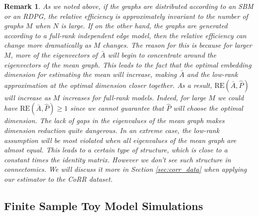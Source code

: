\documentclass[10pt,letterpaper]{article}
\newtheorem{remark}[fact]{Remark}
\renewcommand{\hat}{\widehat}
\begin{document}
\begin{remark}\label{remark:low_rank}
As we noted above, if the graphs are distributed according to an SBM or an RDPG, the relative efficiency is approximately invariant to the number of graphs $M$ when $N$ is large.
If on the other hand, the graphs are generated according to a full-rank independent edge model, then the relative efficiency can change more dramatically as $M$ changes. 
The reason for this is because for larger $M$, more of the eigenvectors of $\bar{A}$ will begin to concentrate around the eigenvectors of the mean graph.
This leads to the fact that the optimal embedding dimension for estimating the mean will increase, making $\bar{A}$ and the low-rank approximation at the optimal dimension closer together. 
As a result, $\mathrm{RE}(\bar{A},\hat{P})$ will increase as $M$ increases for full-rank models.
Indeed, for large $M$ we could have $\mathrm{RE}(\bar{A},\hat{P})\geq 1$ since we cannot guarantee that $\hat{P}$ will choose the optimal dimension.
The lack of gaps in the eigenvalues of the mean graph makes dimension reduction quite dangerous.
In an extreme case, the low-rank assumption will be most violated when all eigenvalues of the mean graph are almost equal. This leads to a certain type of structure, which is close to a constant times the identity matrix. However we don't see such structure in connectomics.
We will discuss it more in Section \ref{sec:corr_data} when applying our estimator to the CoRR dataset.
\end{remark}

\subsection{Finite Sample Toy Model Simulations}\label{sec:sbm_sim}
\end{document}
